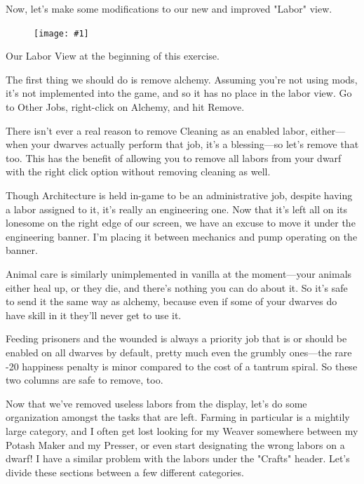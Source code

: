 \documentclass[]{article}
\newcommand{\fullfigure}[1] {
\begin{figure}[h!]
\texttt{[image: \#1]}
\end{figure}
}
\newcommand{\fullfigurecaption}[1] {
\begin{center}
\vspace{-12pt}
#1
\end{center}
}
\begin{document}
Now, let's make some modifications to our new and improved "Labor" view.

\fullfigure{Sec3Fig17}
\fullfigurecaption{Our Labor View at the beginning of this exercise.}

The first thing we should do is remove alchemy. Assuming you're not using mods, it's not implemented into
the game, and so it has no place in the labor view. Go to Other Jobs, right-click on Alchemy, and hit
Remove.
\vspace{12pt}

There isn't ever a real reason to remove Cleaning as an enabled labor, either---when your dwarves
actually perform that job, it's a blessing---so let's remove that too. This has the benefit of allowing
you to remove all labors from your dwarf with the right click option without removing cleaning as well.
\vspace{12pt}

Though Architecture is held in-game to be an administrative job, despite having a labor assigned to it,
it's really an engineering one. Now that it's left all on its lonesome on the right edge of our screen,
we have an excuse to move it under the engineering banner. I'm placing it between mechanics and pump
operating on the banner.
\vspace{12pt}

Animal care is similarly unimplemented in vanilla at the moment---your animals either heal up, or they
die, and there's nothing you can do about it. So it's safe to send it the same way as alchemy, because
even if some of your dwarves do have skill in it they'll never get to use it.
\vspace{12pt}

Feeding prisoners and the wounded is always a priority job that is or should be enabled on all dwarves by
default, pretty much even the grumbly ones---the rare -20 happiness penalty is minor compared to the cost
of a tantrum spiral. So these two columns are safe to remove, too.
\vspace{12pt}

Now that we've removed useless labors from the display, let's do some organization amongst the tasks that
are left. Farming in particular is a mightily large category, and I often get lost looking for my Weaver
somewhere between my Potash Maker and my Presser, or even start designating the wrong labors on a dwarf!
I have a similar problem with the labors under the "Crafts" header. Let's divide these sections between a
few different categories.
\vspace{12pt}
\end{document}
